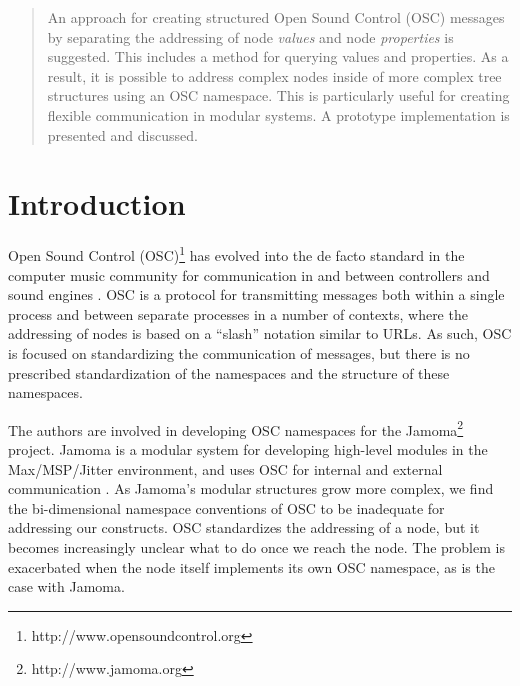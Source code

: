 \documentclass{NIME-alternate}
\begin{document}
\maketitle



\begin{abstract}

An approach for creating structured Open Sound Control (OSC) messages by separating the addressing of node \emph{values} and node \emph{properties} is suggested. This includes a method for querying values and properties. As a result, it is possible to address complex nodes inside of more complex tree structures using an OSC namespace. This is particularly useful for creating flexible communication in modular systems.  A prototype implementation is presented and discussed.

\end{abstract}




\section{Introduction} %
\label{sec:introduction}

Open Sound Control (OSC)\footnote{http://www.opensoundcontrol.org} has evolved into the de facto standard in the computer music community for communication in and between controllers and sound engines \cite{Wright:2003}. OSC is a protocol for transmitting messages both within a single process and between separate processes in a number of contexts, where the addressing of nodes is based on a ``slash'' notation similar to URLs. As such, OSC is focused on standardizing the communication of messages, but there is no prescribed standardization of the namespaces and the structure of these namespaces. 

The authors are involved in developing OSC namespaces for the Jamoma\footnote{http://www.jamoma.org} project. Jamoma is a modular system for developing high-level modules in the Max/MSP/Jitter environment, and uses OSC for internal and external communication \cite{Place:2006}.  As Jamoma's modular structures grow more complex, we find the bi-dimensional namespace conventions of OSC to be inadequate for addressing our constructs.  OSC standardizes the addressing of a node, but it becomes increasingly unclear what to do once we reach the node.  The problem is exacerbated when the node itself implements its own OSC namespace, as is the case with Jamoma.
\end{document}
